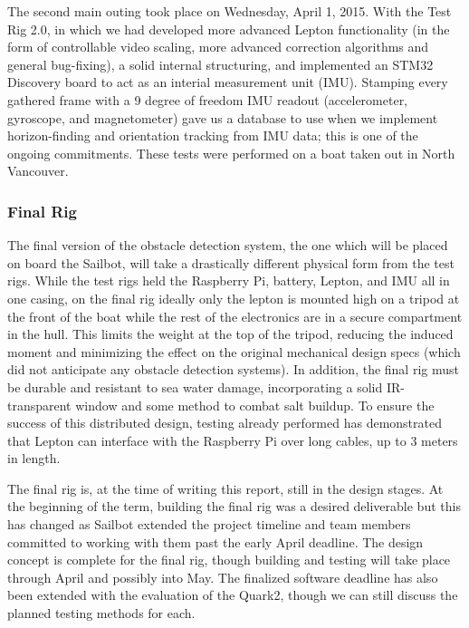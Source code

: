 The second main outing took place on Wednesday, April 1, 2015. With the Test Rig 2.0, in which we had developed more advanced Lepton functionality (in the form of controllable video scaling, more advanced correction algorithms and general bug-fixing), a solid internal structuring, and implemented an STM32 Discovery board to act as an interial measurement unit (IMU). Stamping every gathered frame with a 9 degree of freedom IMU readout (accelerometer, gyroscope, and magnetometer) gave us a database to use when we implement horizon-finding and orientation tracking from IMU data; this is one of the ongoing commitments. These tests were performed on a boat taken out in North Vancouver.


\subsubsection{\label{sec:discussion:testing:testrig3}Final Rig}
The final version of the obstacle detection system, the one which will be placed on board the Sailbot, will take a drastically different physical form from the test rigs. While the test rigs held the Raspberry Pi, battery, Lepton, and IMU all in one casing, on the final rig ideally only the lepton is mounted high on a tripod at the front of the boat while the rest of the electronics are in a secure compartment in the hull. This limits the weight at the top of the tripod, reducing the induced moment and minimizing the effect on the original mechanical design specs (which did not anticipate any obstacle detection systems). In addition, the final rig must be durable and resistant to sea water damage, incorporating a solid IR-transparent window and some method to combat salt buildup. To ensure the success of this distributed design, testing already performed has demonstrated that Lepton can interface with the Raspberry Pi over long cables, up to 3 meters in length.

The final rig is, at the time of writing this report, still in the design stages. At the beginning of the term, building the final rig was a desired deliverable but this has changed as Sailbot extended the project timeline and team members committed to working with them past the early April deadline. The design concept is complete for the final rig, though building and testing will take place through April and possibly into May. The finalized software deadline has also been extended with the evaluation of the Quark2, though we can still discuss the planned testing methods for each.

